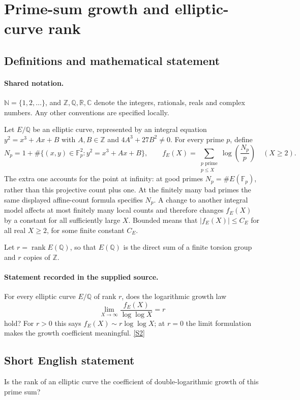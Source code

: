 \documentclass[11pt]{article}
\newcommand{\sref}[2]{\hyperlink{source:#1:#2}{[S#2]}}
\begin{document}
\section{Prime-sum growth and elliptic-curve rank}\label{statement}

\subsection{Definitions and mathematical statement}

\paragraph{Shared notation.}$\mathbb N=\{1,2,\ldots\}$, and $\mathbb Z,\mathbb Q,\mathbb R,\mathbb C$ denote the integers, rationals, reals and complex numbers. Any other conventions are specified locally.


Let $E/\mathbb Q$ be an elliptic curve, represented by an integral equation $y^2=x^3+Ax+B$ with $A,B\in\mathbb Z$ and $4A^3+27B^2\ne0$. For every prime $p$, define
\[
N_p=1+\#\{(x,y)\in\mathbb F_p^2:y^2=x^3+Ax+B\},\qquad
f_E(X)=\sum_{\substack{p\text{ prime}\\p\le X}}\log\!\left(\frac{N_p}{p}\right)\quad(X\ge2).
\]
The extra one accounts for the point at infinity: at good primes $N_p=\#E(\mathbb F_p)$, rather than this projective count plus one. At the finitely many bad primes the same displayed affine-count formula specifies $N_p$. A change to another integral model affects at most finitely many local counts and therefore changes $f_E(X)$ by a constant for all sufficiently large $X$. Bounded means that $|f_E(X)|\le C_E$ for all real $X\ge2$, for some finite constant $C_E$.\par Let $r=\operatorname{rank}E(\mathbb Q)$, so that $E(\mathbb Q)$ is the direct sum of a finite torsion group and $r$ copies of $\mathbb Z$.
\paragraph{Statement recorded in the supplied source.}
For every elliptic curve $E/\mathbb Q$ of rank $r$, does the logarithmic growth law
\[
\lim_{X\to\infty}\frac{f_E(X)}{\log\log X}=r
\]
hold? For $r>0$ this says $f_E(X)\sim r\log\log X$; at $r=0$ the limit formulation makes the growth coefficient meaningful. \sref{statement}{2}
\subsection{Short English statement}
Is the rank of an elliptic curve the coefficient of double-logarithmic growth of this prime sum?
\end{document}
